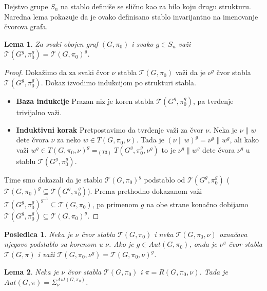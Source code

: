 \documentclass[12pt,oneside]{memoir}
\newtheorem{lemma}{Lema}
\newtheorem{corrolary}{Posledica}
\theoremstyle{definition}
\begin{document}

  Dejstvo grupe $S_n$ na stablo definiše se slično kao za bilo koju drugu
  strukturu. Naredna lema pokazuje da je ovako definisano stablo invarijantno na
  imenovanje čvorova grafa.

  \begin{lemma}
      Za svaki obojen graf $(G, \pi_0)$ i svako $g \in S_n$ važi
      $\mathcal{T}(G^g, \pi_0^g) = \mathcal{T}(G, \pi_0)^g$.
  \end{lemma}

  \begin{proof}
      Dokažimo da za svaki čvor $\nu$ stabla $\mathcal{T}(G, \pi_0)$ važi da je
      $\nu^g$ čvor stabla $\mathcal{T}(G^g, \pi_0^g)$. Dokaz izvodimo indukcijom
      po strukturi stabla.
      \begin{itemize}
     	 \item[] \textbf{Baza indukcije} Prazan niz je koren stabla
     		 $\mathcal{T}(G^g, \pi_0^g)$, pa tvrđenje trivijalno važi.
     	 \item[] \textbf{Induktivni korak} Pretpostavimo da tvrđenje važi za
     		 čvor $\nu$. Neka je $\nu \| w$ dete čvora $\nu$ za neko $w \in
     		 T(G, \pi_0, \nu)$. Tada je $(\nu \| w)^g = \nu^g \| w^g$, ali kako
     		 važi $w^g \in T(G, \pi_0, \nu)^g =_{(T3)} T(G^g, \pi_0^g, \nu^g)$
     		 to je $\nu^g \| w^g$ dete čvora $\nu^g$ u stablu $\mathcal{T}(G^g,
     		 \pi_0^g)$.
      \end{itemize}
      Time smo dokazali da je stablo $\mathcal{T}(G, \pi_0)^g$ podstablo od
      $\mathcal{T}(G^g, \pi_0^g)$ ($\mathcal{T}(G, \pi_0)^g \subseteq
      \mathcal{T}(G^g, \pi_0^g)$). Prema prethodno dokazanom važi
      $\mathcal{T}(G^g, \pi_0^g)^{g^{-1}} \subseteq \mathcal{T}(G, \pi_0)$, pa
      primenom $g$ na obe strane konačno dobijamo $\mathcal{T}(G^g, \pi_0^g)
      \subseteq \mathcal{T}(G, \pi_0)^g$.
  \end{proof}

  \begin{corrolary}
      Neka je $\nu$ čvor stabla $\mathcal{T}(G, \pi_0)$ i neka $\mathcal{T}(G,
      \pi_0, \nu)$ označava njegovo podstablo sa korenom u $\nu$. Ako je $g
      \in Aut(G, \pi_0)$, onda je $\nu^g$ čvor stabla $\mathcal{T}(G, \pi)$ i
      važi $\mathcal{T}(G, \pi_0, \nu^g) = \mathcal{T}(G, \pi_0, \nu)^g$.
  \end{corrolary}

  \begin{lemma}
      Neka je $\nu$ čvor stabla $\mathcal{T}(G, \pi_0)$ i $\pi = R(G, \pi_0,
      \nu)$. Tada je $Aut(G, \pi) = \Sigma_\nu^{Aut(G, \pi_0)}$.
  \end{lemma}
\end{document}
